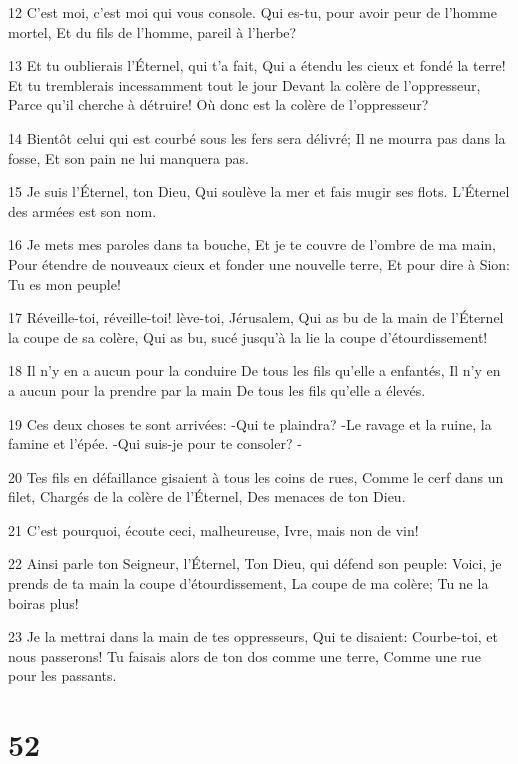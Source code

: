 \par 12 C'est moi, c'est moi qui vous console. Qui es-tu, pour avoir peur de l'homme mortel, Et du fils de l'homme, pareil à l'herbe?
\par 13 Et tu oublierais l'Éternel, qui t'a fait, Qui a étendu les cieux et fondé la terre! Et tu tremblerais incessamment tout le jour Devant la colère de l'oppresseur, Parce qu'il cherche à détruire! Où donc est la colère de l'oppresseur?
\par 14 Bientôt celui qui est courbé sous les fers sera délivré; Il ne mourra pas dans la fosse, Et son pain ne lui manquera pas.
\par 15 Je suis l'Éternel, ton Dieu, Qui soulève la mer et fais mugir ses flots. L'Éternel des armées est son nom.
\par 16 Je mets mes paroles dans ta bouche, Et je te couvre de l'ombre de ma main, Pour étendre de nouveaux cieux et fonder une nouvelle terre, Et pour dire à Sion: Tu es mon peuple!
\par 17 Réveille-toi, réveille-toi! lève-toi, Jérusalem, Qui as bu de la main de l'Éternel la coupe de sa colère, Qui as bu, sucé jusqu'à la lie la coupe d'étourdissement!
\par 18 Il n'y en a aucun pour la conduire De tous les fils qu'elle a enfantés, Il n'y en a aucun pour la prendre par la main De tous les fils qu'elle a élevés.
\par 19 Ces deux choses te sont arrivées: -Qui te plaindra? -Le ravage et la ruine, la famine et l'épée. -Qui suis-je pour te consoler? -
\par 20 Tes fils en défaillance gisaient à tous les coins de rues, Comme le cerf dans un filet, Chargés de la colère de l'Éternel, Des menaces de ton Dieu.
\par 21 C'est pourquoi, écoute ceci, malheureuse, Ivre, mais non de vin!
\par 22 Ainsi parle ton Seigneur, l'Éternel, Ton Dieu, qui défend son peuple: Voici, je prends de ta main la coupe d'étourdissement, La coupe de ma colère; Tu ne la boiras plus!
\par 23 Je la mettrai dans la main de tes oppresseurs, Qui te disaient: Courbe-toi, et nous passerons! Tu faisais alors de ton dos comme une terre, Comme une rue pour les passants.

\chapter{52}

